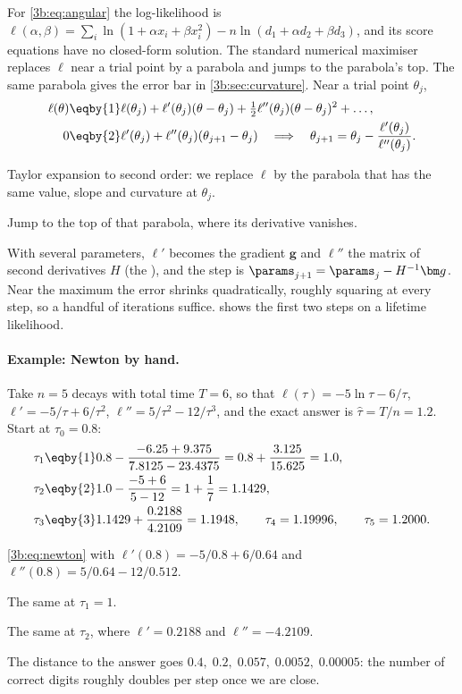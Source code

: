 For \eqref{3b:eq:angular} the log-likelihood is
$\ell(\alpha,\beta)=\sum_i\ln(1+\alpha x_i+\beta x_i^2)-n\ln(d_1+\alpha d_2+\beta d_3)$,
and its score equations have no closed-form solution. The standard
numerical maximiser replaces $\ell$ near a trial point by a parabola and
jumps to the parabola's top. The same parabola gives the error bar in
\cref{3b:sec:curvature}. Near a trial point $\theta_j$,
\begin{align}
  \ell(\theta)&\eqby{1}\ell(\theta_j)+\ell'(\theta_j)(\theta-\theta_j)
   +\tfrac12\ell''(\theta_j)(\theta-\theta_j)^2+\dots,
  \nonumber\\
  0&\eqby{2}\ell'(\theta_j)+\ell''(\theta_j)(\theta_{j+1}-\theta_j)
  \quad\Longrightarrow\quad
  \theta_{j+1}=\theta_j-\frac{\ell'(\theta_j)}{\ell''(\theta_j)} .
  \label{3b:eq:newton}
\end{align}
\begin{explain}
  \item Taylor expansion to second order: we replace $\ell$ by the parabola
        that has the same value, slope and curvature at $\theta_j$.
  \item Jump to the top of that parabola, where its derivative vanishes.
\end{explain}
With several parameters, $\ell'$ becomes the gradient $\bm g$ and $\ell''$
the matrix of second derivatives $H$ (the ), and the step
is $\params_{j+1}=\params_j-H^{-1}\bm g$. Near the maximum the error shrinks
quadratically, roughly squaring at every step, so a handful of iterations
suffice.  shows the first two steps on a lifetime
likelihood.

\paragraph{Example: Newton by hand.}
Take $n=5$ decays with total time $T=6$, so that $\ell(\tau)=-5\ln\tau-6/\tau$,
$\ell'=-5/\tau+6/\tau^2$, $\ell''=5/\tau^2-12/\tau^3$, and the exact answer
is $\hat\tau=T/n=1.2$. Start at $\tau_0=0.8$:
\begin{align*}
  \tau_1&\eqby{1}0.8-\frac{-6.25+9.375}{7.8125-23.4375}
        =0.8+\frac{3.125}{15.625}=1.0,\\
  \tau_2&\eqby{2}1.0-\frac{-5+6}{5-12}=1+\frac17=1.1429,\\
  \tau_3&\eqby{3}1.1429+\frac{0.2188}{4.2109}=1.1948,\qquad
  \tau_4=1.19996,\qquad \tau_5=1.2000 .
\end{align*}
\begin{explain}
  \item \eqref{3b:eq:newton} with $\ell'(0.8)=-5/0.8+6/0.64$ and
        $\ell''(0.8)=5/0.64-12/0.512$.
  \item The same at $\tau_1=1$.
  \item The same at $\tau_2$, where $\ell'=0.2188$ and $\ell''=-4.2109$.
\end{explain}
The distance to the answer goes $0.4,\;0.2,\;0.057,\;0.0052,\;0.00005$: the
number of correct digits roughly doubles per step once we are close.

